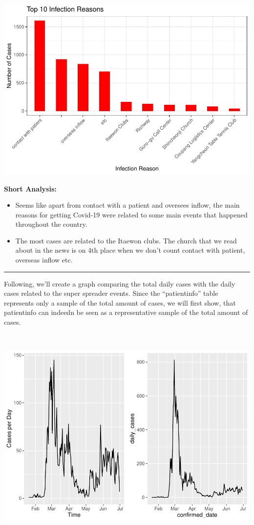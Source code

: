 \documentclass[
]{article}
\providecommand{\tightlist}{%
  \setlength{\itemsep}{0pt}\setlength{\parskip}{0pt}}
\begin{document}
\includegraphics{Main_Analysis_files/figure-latex/unnamed-chunk-15-1.pdf}

\textbf{Short Analysis:}

\begin{itemize}
\tightlist
\item
  Seems like apart from contact with a patient and oversees inflow, the
  main reasons for getting Covid-19 were related to some main events
  that happened throughout the country.
\item
  The most cases are related to the Itaewon clubs. The church that we
  read about in the news is on 4th place when we don't count contact
  with patient, overseas inflow etc.
\end{itemize}

\begin{center}\rule{0.5\linewidth}{0.5pt}\end{center}

Following, we'll create a graph comparing the total daily cases with the
daily cases related to the super spreader events. Since the
``patientinfo'' table represents only a sample of the total amount of
cases, we will first show, that patientinfo can indeedn be seen as a
representative sample of the total amount of cases.

~

\includegraphics{Main_Analysis_files/figure-latex/unnamed-chunk-16-1.pdf}
\end{document}
